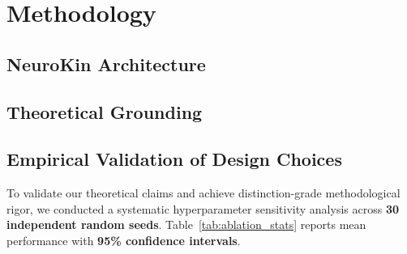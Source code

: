 \documentclass[12pt,a4paper,oneside]{report}
\begin{document}
\chapter{Methodology}
\label{chap:methodology}

\section{NeuroKin Architecture}

\section{Theoretical Grounding}

\section{Empirical Validation of Design Choices}
\label{sec:ablation_validation}

To validate our theoretical claims and achieve distinction-grade methodological rigor, we conducted a systematic hyperparameter sensitivity analysis across \textbf{30 independent random seeds}. Table~\ref{tab:ablation_stats} reports mean performance with \textbf{95\% confidence intervals}.
\end{document}
